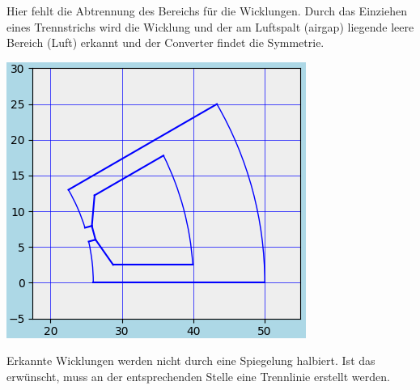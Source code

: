 \documentclass[10pt, a4paper,german]{scrartcl}
\begin{document}
Hier fehlt die Abtrennung des Bereichs für die Wicklungen. Durch das Einziehen eines
Trennstrichs wird die Wicklung und der am Luftspalt (airgap) liegende leere Bereich
(Luft) erkannt und der Converter findet die Symmetrie.
\begin{center}
\includegraphics[width=0.45\linewidth]{BspWindings}
\end{center}
Erkannte Wicklungen werden nicht durch eine Spiegelung halbiert. Ist das erwünscht,
muss an der entsprechenden Stelle eine Trennlinie erstellt werden.
\end{document}
